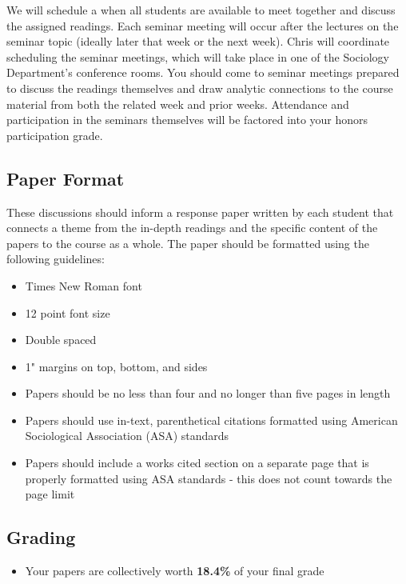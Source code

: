\documentclass[
]{book}
\providecommand{\tightlist}{%
  \setlength{\itemsep}{0pt}\setlength{\parskip}{0pt}}
\newenvironment{rmdblock}[1]
  {\begin{shaded*}
  \begin{itemize}
  \renewcommand{\labelitemi}{
    \raisebox{-.7\height}[0pt][0pt]{
      {\setkeys{Gin}{width=3em,keepaspectratio}\texttt{[image: images/\#1]}}
    }
  }
  \item
  }
  {
  \end{itemize}
  \end{shaded*}
  }
\newenvironment{rmdtip}
  {\begin{rmdblock}{tip}}
  {\end{rmdblock}}
\begin{document}
We will schedule a when all students are available to meet together and discuss the assigned readings. Each seminar meeting will occur after the lectures on the seminar topic (ideally later that week or the next week). Chris will coordinate scheduling the seminar meetings, which will take place in one of the Sociology Department's conference rooms. You should come to seminar meetings prepared to discuss the readings themselves and draw analytic connections to the course material from both the related week and prior weeks. Attendance and participation in the seminars themselves will be factored into your honors participation grade.

\hypertarget{paper-format}{%
\subsection{Paper Format}\label{paper-format}}

These discussions should inform a response paper written by each student that connects a theme from the in-depth readings and the specific content of the papers to the course as a whole. The paper should be formatted using the following guidelines:

\begin{itemize}
\tightlist
\item
  Times New Roman font
\item
  12 point font size
\item
  Double spaced
\item
  1" margins on top, bottom, and sides
\item
  Papers should be no less than four and no longer than five pages in length
\item
  Papers should use in-text, parenthetical citations formatted using American Sociological Association (ASA) standards
\item
  Papers should include a works cited section on a separate page that is properly formatted using ASA standards - this does not count towards the page limit
\end{itemize}

\hypertarget{grading-1}{%
\subsection{Grading}\label{grading-1}}

\begin{rmdtip}
Your papers are collectively worth \textbf{18.4\%} of your final grade
\end{rmdtip}
\end{document}
